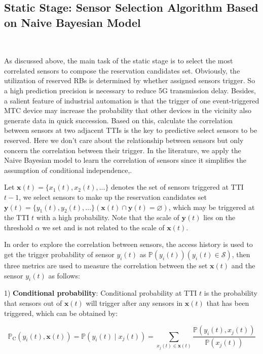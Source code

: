 \documentclass{SCIS2021}
\begin{document}
	\subsection{Static Stage: Sensor Selection Algorithm Based on Naive Bayesian Model}~{}
	\label{sec:selection}
	\par As discussed above, the main task of the static stage is to select the most correlated sensors to compose the reservation candidates set. Obviously, the utilization of reserved RBs is determined by whether assigned sensors trigger. So a high prediction precision is necessary to reduce 5G transmission delay. Besides, a salient feature of industrial automation is that the trigger of one event-triggered MTC device may increase the probability that other devices in the vicinity also generate data in quick succession\cite{shafiq2013large,li2018predictive}. Based on this, calculate the correlation between sensors at two adjacent TTIs is the key to predictive select sensors to be reserved. Here we don't care about the relationship between sensors but only concern the correlation between their trigger. In the literature\cite{li2018predictive}, we apply the Naive Bayesian model to learn the correlation of sensors since it simplifies the assumption of conditional independence,.


	\par Let $\bm{x}(t)=\{x_{1}(t), x_{2}(t), ...\}$ denotes the set of sensors triggered at TTI $t-1$, we select sensors to make up the reservation candidates set $\bm{y}(t) = \{y_{1}(t), y_{2}(t), ...\}(\bm{x}(t) \cap \bm{y}(t) = \varnothing)$, which may be triggered at the TTI $t$ with a high probability. Note that the scale of $\bm{y}(t)$ lies on the threshold $\alpha$ we set and is not related to the scale of $\bm{x}(t)$.

	\par In order to explore the correlation between sensors, the access history is used to get the trigger probability of sensor $y_{i}(t)$ as $\bm{\mathbb{P}}(y_{i}(t)) (y_{i}(t) \in \mathcal{S})$, then three metrics are used to measure the correlation between the set $\bm{x}(t)$ and the sensor $y_{i}(t)$ as follows\cite{sanasam2010feature}:

	\par 1) \textbf{Conditional probability}: Conditional probability at TTI $t$ is the probability that sensors out of $\bm{x}(t)$ will trigger after any sensors in $\bm{x}(t)$ that has been triggered, which can be obtained by:

	\setlength\abovedisplayskip{-15pt}
	\begin{center}
		\begin{equation}
			\mathbb{P}_{\mathrm{C}}(y_{i}(t),  \bm{x}(t))= \mathbb{P}(y_{i}(t) \mid x_{j}(t))= \sum_{x_{j}(t)\in \bm{x}(t)} \frac{\mathbb{P}(y_{i}(t), x_{j}(t))}{\mathbb{P}(x_{j}(t))}
		\end{equation}
	\end{center}
	\setlength\belowdisplayskip{-8pt}
\end{document}
